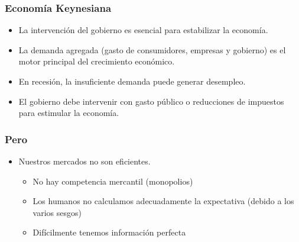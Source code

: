 \documentclass{beamer}
\begin{document}
\begin{frame}
\frametitle{Economía Keynesiana}
\begin{itemize}
    \pause
    \item La intervención del gobierno es esencial para estabilizar la economía.
    \pause
    \item La demanda agregada (gasto de consumidores, empresas y gobierno) es el motor principal del crecimiento económico.
    \pause
    \item En recesión, la insuficiente demanda puede generar desempleo.
    \pause
    \item El gobierno debe intervenir con gasto público o reducciones de impuestos para estimular la economía.
\end{itemize}
\end{frame}

\begin{frame}
\frametitle{Pero}
\begin{itemize}
\item Nuestros mercados no son eficientes.
\begin{itemize}
\item No hay competencia mercantil (monopolios)
\pause
\item Los humanos no calculamos adecuadamente la expectativa (debido a los varios sesgos)
\pause
\item Difícilmente tenemos información perfecta
\end{itemize}
\end{itemize}
\end{frame}




\end{document}
